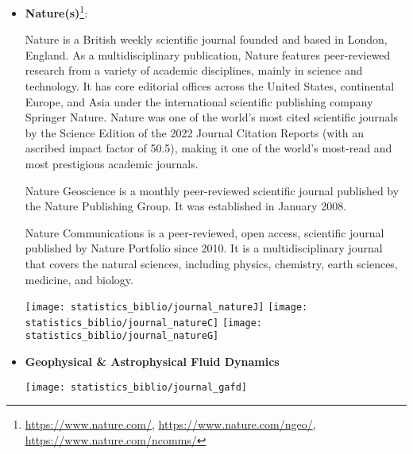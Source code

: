 \begin{itemize}
\item {\bf Nature(s)}\footnote{
\url{https://www.nature.com/},
\url{https://www.nature.com/ngeo/},
\url{https://www.nature.com/ncomms/}
}:

Nature is a British weekly scientific journal founded and based in London, England. 
As a multidisciplinary publication, Nature features peer-reviewed research from a variety of 
academic disciplines, mainly in science and technology. It has core editorial offices across the 
United States, continental Europe, and Asia under the international scientific publishing company 
Springer Nature. Nature was one of the world's most cited scientific journals by the Science Edition 
of the 2022 Journal Citation Reports (with an ascribed impact factor of 50.5), making it one of the world's most-read and most prestigious academic journals.

Nature Geoscience is a monthly peer-reviewed scientific journal published by the Nature Publishing Group. 
It was established in January 2008. 

Nature Communications is a peer-reviewed, open access, scientific journal published by Nature Portfolio since 2010. 
It is a multidisciplinary journal that covers the natural sciences, including physics, chemistry, earth sciences, 
medicine, and biology.

\begin{center}
\texttt{[image: statistics\_biblio/journal\_natureJ]}
\texttt{[image: statistics\_biblio/journal\_natureC]}
\texttt{[image: statistics\_biblio/journal\_natureG]}
\end{center}

\item {\bf Geophysical \& Astrophysical Fluid Dynamics} 

\begin{center}
\texttt{[image: statistics\_biblio/journal\_gafd]}
\end{center}




\end{itemize}




